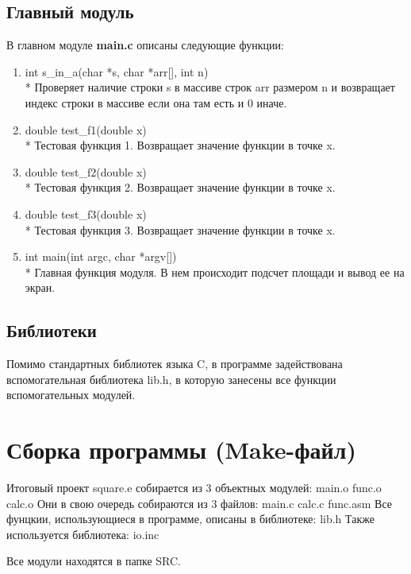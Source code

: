 \documentclass[a4paper,12pt,titlepage,finall]{article}
\begin{document}
\subsection{Главный модуль}

В главном модуле \textbf{main.c} описаны следующие функции:

\begin{enumerate}
    \item int s\_in\_a(char *s, char *arr[], int n)
    \\* Проверяет наличие строки s в массиве строк arr размером n и возвращает индекс строки в массиве если она там есть и 0 иначе.
    \item double test\_f1(double x)
    \\* Тестовая функция 1. Возвращает значение функции в точке x.
    \item double test\_f2(double x)
    \\* Тестовая функция 2. Возвращает значение функции в точке x.
    \item double test\_f3(double x)
    \\* Тестовая функция 3. Возвращает значение функции в точке x.
    \item int main(int argc, char *argv[])
    \\* Главная функция модуля. В нем происходит подсчет площади и вывод ее на экран.
\end{enumerate}

\subsection{Библиотеки}

Помимо стандартных библиотек языка C, в программе задействована вспомогательная библиотека lib.h, в которую занесены все функции вспомогательных модулей.

\newpage

\section{Сборка программы (Make-файл)}

Итоговый проект square.e собирается из 3 объектных модулей: 
main.o func.o calc.o
Они в свою очередь собираются из 3 файлов: 
main.c calc.c func.asm
Все фунцкии, использующиеся в программе, описаны в библиотеке: lib.h
Также используется библиотека: io.inc

Все модули находятся в папке \textsc{SRC}.
\end{document}
